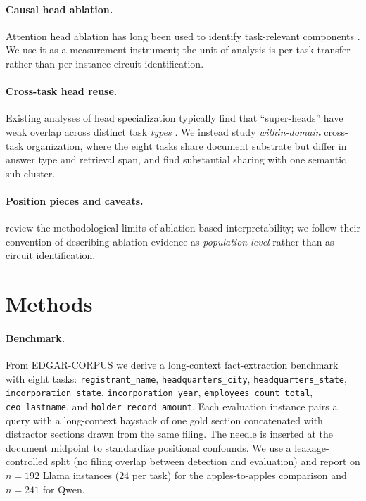\documentclass{article}
\theoremstyle{plain}
\theoremstyle{definition}
\theoremstyle{remark}
\begin{document}
\paragraph{Causal head ablation.} Attention head ablation has long been used to identify task-relevant components \citep{voita2019heads,michel2019heads,wang2022interpretability,olsson2022induction}. We use it as a measurement instrument; the unit of analysis is per-task transfer rather than per-instance circuit identification.

\paragraph{Cross-task head reuse.} Existing analyses of head specialization typically find that ``super-heads'' have weak overlap across distinct task \emph{types} \citep{chowdhary2025kmshc}. We instead study \emph{within-domain} cross-task organization, where the eight tasks share document substrate but differ in answer type and retrieval span, and find substantial sharing with one semantic sub-cluster.

\paragraph{Position pieces and caveats.} \citet{sharkey2025openproblems} review the methodological limits of ablation-based interpretability; we follow their convention of describing ablation evidence as \emph{population-level} rather than as circuit identification.

\section{Methods}
\label{sec:methods}

\paragraph{Benchmark.} From EDGAR-CORPUS \citep{loukas2021edgar} we derive a long-context fact-extraction benchmark with eight tasks: \texttt{registrant\_name}, \texttt{headquarters\_city}, \texttt{headquarters\_state}, \texttt{incorporation\_state}, \texttt{incorporation\_year}, \texttt{employees\_count\_total}, \texttt{ceo\_lastname}, and \texttt{holder\_record\_amount}. Each evaluation instance pairs a query with a long-context haystack of one gold section concatenated with distractor sections drawn from the same filing. The needle is inserted at the document midpoint to standardize positional confounds. We use a leakage-controlled split (no filing overlap between detection and evaluation) and report on $n{=}192$ Llama instances ($24$ per task) for the apples-to-apples comparison and $n{=}241$ for Qwen.
\end{document}
